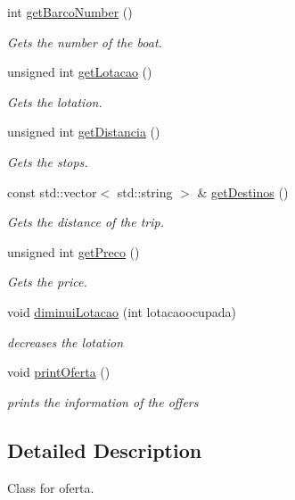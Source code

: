 \begin{DoxyCompactItemize}
int \hyperlink{classOferta_abf0f062fa730edf6d4232926980b106c}{get\+Barco\+Number} ()
\begin{DoxyCompactList}\small\item\em Gets the number of the boat. \end{DoxyCompactList}\item 
unsigned int \hyperlink{classOferta_a9c8fbec401e54e590828209931bf25b0}{get\+Lotacao} ()
\begin{DoxyCompactList}\small\item\em Gets the lotation. \end{DoxyCompactList}\item 
unsigned int \hyperlink{classOferta_a0d07f80f25f4fb21c0819c3e25d67fb9}{get\+Distancia} ()
\begin{DoxyCompactList}\small\item\em Gets the stops. \end{DoxyCompactList}\item 
const std\+::vector$<$ std\+::string $>$ \& \hyperlink{classOferta_a746c91e5db19098d211a3f6bde2ec8ec}{get\+Destinos} ()
\begin{DoxyCompactList}\small\item\em Gets the distance of the trip. \end{DoxyCompactList}\item 
unsigned int \hyperlink{classOferta_a6237afc2e8a33fb55b1ef0decf9d9aaa}{get\+Preco} ()
\begin{DoxyCompactList}\small\item\em Gets the price. \end{DoxyCompactList}\item 
void \hyperlink{classOferta_a15e6c1e4f49243136eb5ca1d46925a77}{diminui\+Lotacao} (int lotacaoocupada)
\begin{DoxyCompactList}\small\item\em decreases the lotation \end{DoxyCompactList}\item 
\mbox{\label{classOferta_a745e9845f3d1a36e8a8712d576f303ba}} 
void \hyperlink{classOferta_a745e9845f3d1a36e8a8712d576f303ba}{print\+Oferta} ()
\begin{DoxyCompactList}\small\item\em prints the information of the offers \end{DoxyCompactList}\end{DoxyCompactItemize}


\subsection{Detailed Description}
Class for oferta. 

